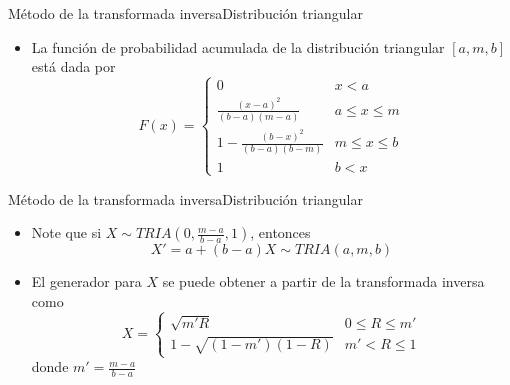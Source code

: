 \begin{frame}{Método de la transformada inversa}{Distribución triangular}
    \begin{itemize}
        \item La función de probabilidad acumulada de la distribución triangular $\left[a,m,b\right]$ está dada por
        \begin{equation*}
            F(x)=\left\{\begin{array}{ll}
                 0 & x < a  \\
                 \frac{\left(x-a\right)^2}{\left(b-a\right)\left(m-a\right)} & a\leq x\leq m \\ 
                 1-\frac{\left(b-x\right)^2}{\left(b-a\right)\left(b-m\right)} & m\leq x\leq b \\ 
                 1 & b<x
            \end{array}\right.
        \end{equation*}
    \end{itemize}
\end{frame}

\begin{frame}{Método de la transformada inversa}{Distribución triangular}
    \begin{itemize}
        \item Note que si $X \sim TRIA\left(0,\frac{m-a}{b-a},1\right)$, entonces \begin{equation*}
            X'=a+(b-a)X \sim TRIA\left(a,m,b\right) 
        \end{equation*}
        \item El generador para $X$ se puede obtener a partir de la transformada inversa como
        \begin{equation*}
            X=\left\{\begin{array}{ll}
            \sqrt{m'R} & 0 \leq R \leq m'\\
            1-\sqrt{\left(1-m'\right)\left(1-R\right)} & m'<R\leq 1
            \end{array}\right.
        \end{equation*}
        donde $m'=\frac{m-a}{b-a}$
    \end{itemize}
\end{frame}

